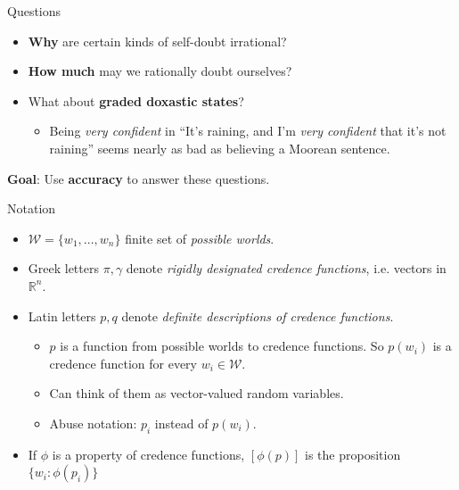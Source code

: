 \documentclass[aspectratio=169, dvipsnames]{beamer}
\newcommand{\R}{\mathbb{R}}
\newcommand{\W}{\mathcal{W}}
\begin{document}
\begin{frame}{Questions}
  \begin{itemize}
  \item \textbf{\alert{Why}} are certain kinds of self-doubt irrational? 
  \item \alert{\textbf{How much}} may we rationally doubt ourselves? 
  \item What about \textbf{\alert{graded doxastic states}}?
    \begin{itemize}
    \item Being \textit{very confident} in ``It's raining, and I'm \textit{very confident} that it's not raining''
      seems nearly as bad as believing a Moorean sentence.
    \end{itemize}
  \end{itemize}
  \textbf{Goal}: Use \textbf{\alert{accuracy}} to answer these questions.
\end{frame}

\begin{frame}{Notation}
  \begin{itemize}
    \item $\W =\{w_1, ..., w_n\}$ finite set of \textit{possible worlds}.
    \item Greek letters $\pi, \gamma$ denote \textit{rigidly designated credence functions}, i.e. vectors in $\R^n$.
    \item Latin letters $p, q$ denote \textit{definite descriptions of credence functions}.
      \begin{itemize}
      \item $p$ is a function from possible worlds to credence functions. So $p(w_i)$ is a credence function for every $w_i \in \W$.
      \item Can think of them as vector-valued random variables.
      \item Abuse notation: $p_i$ instead of $p(w_i)$.
      \end{itemize}
    \item If $\phi$ is a property of credence functions, $[\phi(p)]$ is the proposition $\{w_i: \phi(p_i)\}$
  \end{itemize}
\end{frame}
\end{document}
